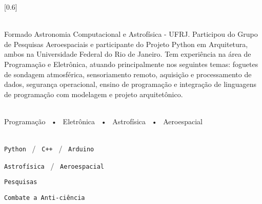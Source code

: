 \documentclass[darkhipster]{simplehipstercv}
\begin{document}
\setlength{\columnsep}{0.5cm}
[0.6]
\begin{paracol}{2}

\paracolbackgroundoptions



\footnotesize
{\setasidefontcolour
\flushleft
\begin{center}
\end{center}

\\[0.5em]

{\footnotesize
Formado Astronomia Computacional e Astrofísica - UFRJ. Participou do Grupo de Pesquisas Aeroespaciais e participante do Projeto Python em Arquitetura, ambos na Universidade Federal do Rio de Janeiro. Tem experiência na área de Programação e Eletrônica, atuando principalmente nos seguintes temas: foguetes de sondagem atmosférica, sensoriamento remoto, aquisição e processamento de dados, segurança operacional, ensino de programação e integração de linguagens de programação com modelagem e projeto arquitetônico.}
\bigskip

 \\[0.5em]

Programação ~•~ Eletrônica ~•~ Astrofísica ~•~ Aeroespacial

\bigskip


\\[0.5em]

\texttt{Python} ~/~ \texttt{C++} ~/~ \texttt{Arduino}

\texttt{Astrofísica} ~/~ \texttt{Aeroespacial}

\texttt{Pesquisas}

\texttt{Combate a Anti-ciência}

\vspace{4em}


\phantom{turn the page}

}
\end{paracol}
\end{document}

